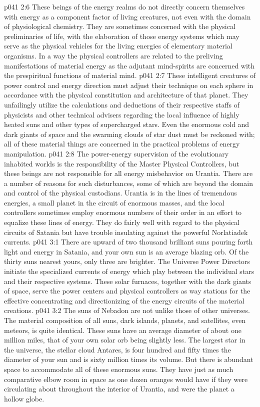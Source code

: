 \pc \vs p041 2:6 These beings of the energy realms do not directly concern themselves with energy as a component factor of living creatures, not even with the domain of physiological chemistry. They are sometimes concerned with the physical preliminaries of life, with the elaboration of those energy systems which may serve as the physical vehicles for the living energies of elementary material organisms. In a way the physical controllers are related to the preliving manifestations of material energy as the adjutant mind\hyp{}spirits are concerned with the prespiritual functions of material mind.
\pc \vs p041 2:7 These intelligent creatures of power control and energy direction must adjust their technique on each sphere in accordance with the physical constitution and architecture of that planet. They unfailingly utilize the calculations and deductions of their respective staffs of physicists and other technical advisers regarding the local influence of highly heated suns and other types of supercharged stars. Even the enormous cold and dark giants of space and the swarming clouds of star dust must be reckoned with; all of these material things are concerned in the practical problems of energy manipulation.
\vs p041 2:8 The power\hyp{}energy supervision of the evolutionary inhabited worlds is the responsibility of the Master Physical Controllers, but these beings are not responsible for all energy misbehavior on Urantia. There are a number of reasons for such disturbances, some of which are beyond the domain and control of the physical custodians. Urantia is in the lines of tremendous energies, a small planet in the circuit of enormous masses, and the local controllers sometimes employ enormous numbers of their order in an effort to equalize these lines of energy. They do fairly well with regard to the physical circuits of Satania but have trouble insulating against the powerful Norlatiadek currents.
\vs p041 3:1 There are upward of two thousand brilliant suns pouring forth light and energy in Satania, and your own sun is an average blazing orb. Of the thirty suns nearest yours, only three are brighter. The Universe Power Directors initiate the specialized currents of energy which play between the individual stars and their respective systems. These solar furnaces, together with the dark giants of space, serve the power centers and physical controllers as way stations for the effective concentrating and directionizing of the energy circuits of the material creations.
\vs p041 3:2 The suns of Nebadon are not unlike those of other universes. The material composition of all suns, dark islands, planets, and satellites, even meteors, is quite identical. These suns have an average diameter of about one million miles, that of your own solar orb being slightly less. The largest star in the universe, the stellar cloud Antares, is four hundred and fifty times the diameter of your sun and is sixty million times its volume. But there is abundant space to accommodate all of these enormous suns. They have just as much comparative elbow room in space as one dozen oranges would have if they were circulating about throughout the interior of Urantia, and were the planet a hollow globe.
